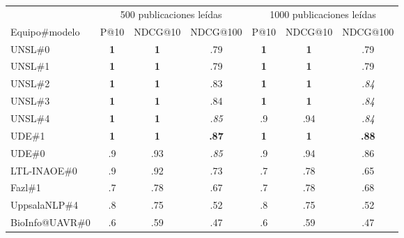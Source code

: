 \begin{itemize}
\begin{table}[t!]
{\

\


\begin{tabular}{l c c c|c c c}
\hline
& \multicolumn{3}{c}{500 publicaciones leídas} & \multicolumn{3}{c}{1000 publicaciones leídas} \\
Equipo\#modelo & P@10 & NDCG@10 & NDCG@100 &  P@10 & NDCG@10 & NDCG@100 \\ \hline
UNSL\#0 & \textbf{1} & \textbf{1} & .79 & \textbf{1} & \textbf{1} & .79 \\
UNSL\#1 & \textbf{1} & \textbf{1} & .79 & \textbf{1} & \textbf{1} & .79 \\
UNSL\#2 & \textbf{1} & \textbf{1} & .83 & \textbf{1} & \textbf{1} & \emph{.84} \\
UNSL\#3 & \textbf{1} & \textbf{1} & .84 & \textbf{1} & \textbf{1} & \emph{.84}  \\
UNSL\#4 & \textbf{1} & \textbf{1} & \emph{.85} & .9 & .94 & \emph{.84} \\
\hline\hline
UDE\#1 &  \textbf{1} & \textbf{1} & \textbf{.87} & \textbf{1} & \textbf{1} & \textbf{.88} \\
UDE\#0 &  .9 & .93 & \emph{.85} & .9 & .94 & .86 \\
LTL-INAOE\#0 & .9 & .92 & .73 & .7 & .78 & .65 \\
Fazl\#1 &  .7 & .78 & .67 & .7 & .78 & .68 \\
UppsalaNLP\#4 &  .8 & .75 & .52 & .8 & .75 & .52 \\
BioInfo@UAVR\#0 &  .6 & .59 & .47 & .6 & .59 & .47 \\

\hline
\hline
\end{tabular}}

\end{table}


\end{itemize}
